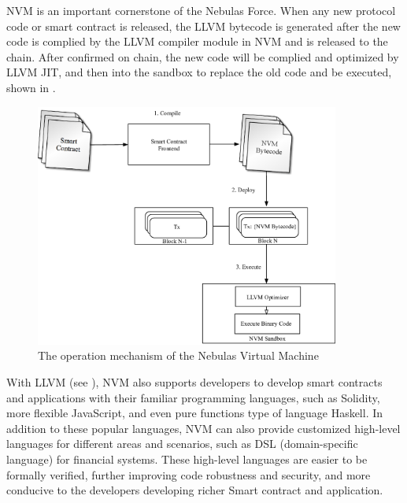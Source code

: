 NVM is an important cornerstone of the Nebulas Force. When any new protocol
code or smart contract is released, the LLVM bytecode is generated after the
new code is complied by the LLVM compiler module in NVM and is released to the
chain. After confirmed on chain, the new code will be complied and
optimized by LLVM JIT, and then into the sandbox to replace the old code and
be executed, shown in .

\begin{figure}[h]
\centering
\includegraphics[width=10cm]{./figs/nvm-process}
\caption{The operation mechanism of the Nebulas Virtual Machine}
\label{fig:nvm-process}
\end{figure}

With LLVM (see ), NVM also supports developers to develop
smart contracts and applications with their familiar programming languages,
such as Solidity, more flexible JavaScript, and even pure functions type of
language Haskell. In addition to these popular languages, NVM can also provide
customized high-level languages for different areas and scenarios, such as DSL
(domain-specific language) for financial systems. These high-level languages
are easier to be formally verified, further improving code robustness and
security, and more conducive to the developers developing richer Smart contract
and application.